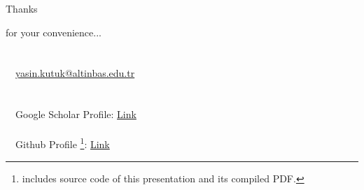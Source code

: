\documentclass{beamer}
\begin{document}
\begin{frame} {Thanks}

\begin{center}
for your convenience...\\
\\~\
\\~\
\href{mailto:yasin.kutuk@altinbas.edu.tr}{yasin.kutuk@altinbas.edu.tr}\\
\\~\
\\~\
Google Scholar Profile: \href{https://scholar.google.com.tr/citations?user=Cj_erekAAAAJ&hl=tr&oi=ao}{Link}
\\~\
\\~\
Github Profile \footnote{\tiny includes source code of this presentation and its compiled PDF.}: \href{https://github.com/yasinkutuk/}{Link}
\end{center}
\end{frame}
\end{document}
